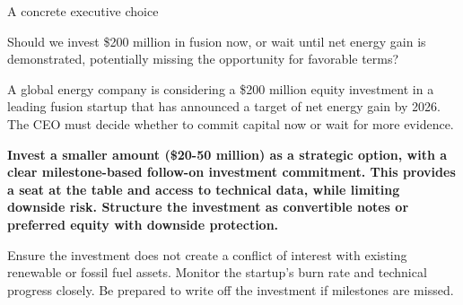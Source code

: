 \documentclass[10pt,a4paper]{article}
\begin{document}
\clearpage
{\sffamily\fontsize{22}{27}\selectfont\color{BONavy} A concrete executive choice}\par\vspace{10pt}
\begin{minipage}[t]{0.43\linewidth}
{\sffamily\fontsize{17}{22}\selectfont\color{BOGreen} Should we invest \$200 million in fusion now, or wait until net energy gain is demonstrated, potentially missing the opportunity for favorable terms?}\par
\end{minipage}\hfill\begin{minipage}[t]{0.50\linewidth}
{\small A global energy company is considering a \$200 million equity investment in a leading fusion startup that has announced a target of net energy gain by 2026. The CEO must decide whether to commit capital now or wait for more evidence.}\par
{\small\bfseries\color{BOText} Invest a smaller amount (\$20-50 million) as a strategic option, with a clear milestone-based follow-on investment commitment. This provides a seat at the table and access to technical data, while limiting downside risk. Structure the investment as convertible notes or preferred equity with downside protection.}\par\vspace{5pt}
{\footnotesize\color{BOMuted} Ensure the investment does not create a conflict of interest with existing renewable or fossil fuel assets. Monitor the startup's burn rate and technical progress closely. Be prepared to write off the investment if milestones are missed.}\par\end{minipage}
\end{document}
